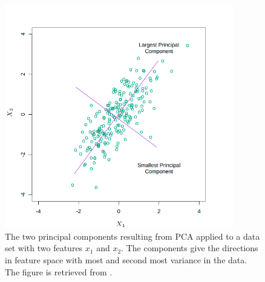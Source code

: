 \begin{figure}[H]
    \centering
    \includegraphics[width=10cm]{latex/figures/pca.png}
    \caption{The two principal components resulting from PCA applied to a data set with two features $x_1$ and $x_2$. The components give the directions in feature space with most and second most variance in the data. The figure is retrieved from \citet{hastie01statisticallearning}.}
    \label{fig:pca}
\end{figure}